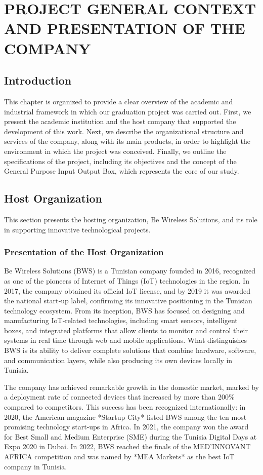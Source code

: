 \chapter{PROJECT GENERAL CONTEXT AND PRESENTATION OF THE COMPANY}

\section{Introduction}

This chapter is organized to provide a clear overview of the academic and industrial
framework in which our graduation project was carried out. First, we present the academic
institution and the host company that supported the development of this work. Next, we
describe the organizational structure and services of the company, along with its main
products, in order to highlight the environment in which the project was conceived.
Finally, we outline the specifications of the project, including its objectives and the
concept of the General Purpose Input Output Box, which represents the core of our study.


\section{Host Organization}
This section presents the hosting organization, Be Wireless Solutions, and its role in
supporting innovative technological projects.

\subsection{Presentation of the Host Organization}

Be Wireless Solutions (BWS) is a Tunisian company founded in 2016, recognized as one of
the pioneers of Internet of Things (IoT) technologies in the region. In 2017, the company
obtained its official IoT license, and by 2019 it was awarded the national start‑up label,
confirming its innovative positioning in the Tunisian technology ecosystem. From its
inception, BWS has focused on designing and manufacturing IoT‑related technologies,
including smart sensors, intelligent boxes, and integrated platforms that allow clients to
monitor and control their systems in real time through web and mobile applications. What
distinguishes BWS is its ability to deliver complete solutions that combine hardware,
software, and communication layers, while also producing its own devices locally in
Tunisia.

The company has achieved remarkable growth in the domestic market, marked by a
deployment rate of connected devices that increased by more than 200\% compared to
competitors. This success has been recognized internationally: in 2020, the American
magazine *Startup City* listed BWS among the ten most promising technology start‑ups in
Africa. In 2021, the company won the award for Best Small and Medium Enterprise (SME)
during the Tunisia Digital Days at Expo 2020 in Dubai. In 2022, BWS reached the finals of
the MED’INNOVANT AFRICA competition and was named by *MEA Markets* as the best IoT
company in Tunisia.

